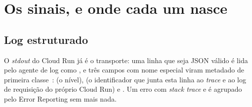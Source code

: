 \section{Os sinais, e onde cada um nasce}

\subsection{Log estruturado}
\label{sec:log-estruturado}

O \emph{stdout} do Cloud Run já é o transporte: uma linha que seja JSON
válido é lida pelo agente de log como , e três campos com
nome especial viram metadado de primeira classe~\cite{gcpobservability2026}:
 (o nível),  (o
identificador que junta esta linha ao \emph{trace} e ao log de requisição do
próprio Cloud Run) e . Um erro com
\emph{stack trace} e  é agrupado pelo Error Reporting
sem mais nada.


